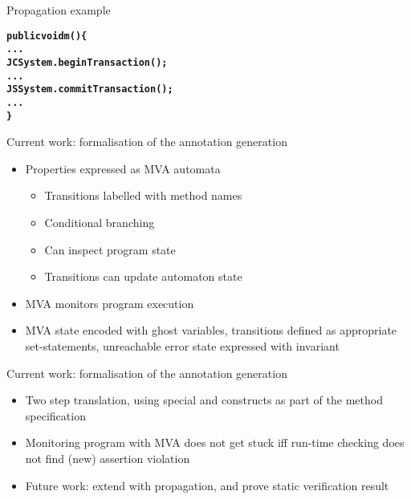 \documentclass[final,nocolorBG,a4,marieke,nototal,ps, accumulate,slideColor]{prosper}
\begin{document}
\begin{slide}{Propagation example}
\begin{alltt}
\textbf{
public void m() \{
   ...
   JCSystem.beginTransaction();
   ...
   JSSystem.commitTransaction();
   ...
   \}}
\end{alltt}
\end{slide}

\begin{slide}{Current work: formalisation of the annotation
generation}
\begin{itemize}
\item Properties expressed as MVA automata
\begin{itemize}
\item Transitions labelled with method names
\item Conditional branching
\item Can inspect program state
\item Transitions can update automaton state
\end{itemize}
\item MVA monitors program execution
\item MVA state encoded with ghost variables, transitions defined as
appropriate set-statements, unreachable error state expressed with
invariant
\end{itemize}
\end{slide}


\begin{slide}{Current work: formalisation of the annotation
generation}
\begin{itemize}
\item Two step translation, using special  and
 constructs as part of the method specification
\item Monitoring program with MVA does not get stuck iff run-time
checking does not find (new) assertion violation
\item Future work: extend with propagation, and prove static
verification result
\end{itemize}
\end{slide}
\end{document}
